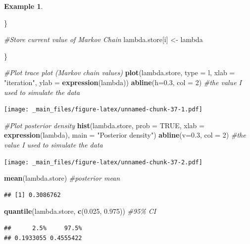 \documentclass[
]{book}
\newenvironment{Shaded}{\begin{snugshade}}{\end{snugshade}}
\newcommand{\AttributeTok}[1]{\textcolor[rgb]{0.13,0.29,0.53}{#1}}
\newcommand{\CommentTok}[1]{\textcolor[rgb]{0.56,0.35,0.01}{\textit{#1}}}
\newcommand{\ConstantTok}[1]{\textcolor[rgb]{0.56,0.35,0.01}{#1}}
\newcommand{\DecValTok}[1]{\textcolor[rgb]{0.00,0.00,0.81}{#1}}
\newcommand{\FloatTok}[1]{\textcolor[rgb]{0.00,0.00,0.81}{#1}}
\newcommand{\FunctionTok}[1]{\textcolor[rgb]{0.13,0.29,0.53}{\textbf{#1}}}
\newcommand{\NormalTok}[1]{#1}
\newcommand{\OtherTok}[1]{\textcolor[rgb]{0.56,0.35,0.01}{#1}}
\newcommand{\StringTok}[1]{\textcolor[rgb]{0.31,0.60,0.02}{#1}}
\theoremstyle{definition}
\theoremstyle{definition}
\newtheorem{example}{Example}[chapter]
\theoremstyle{definition}
\theoremstyle{definition}
\theoremstyle{remark}
\begin{document}
\begin{example}
\begin{Shaded}
\begin{Highlighting}[]
\NormalTok{  \}}
  
  \CommentTok{\#Store current value of Markov Chain}
\NormalTok{  lambda.store[i] }\OtherTok{\textless{}{-}}\NormalTok{ lambda}
  
\NormalTok{\}}

\CommentTok{\#Plot trace plot (Markov chain values)}
\FunctionTok{plot}\NormalTok{(lambda.store, }\AttributeTok{type =} \StringTok{\textquotesingle{}l\textquotesingle{}}\NormalTok{, }\AttributeTok{xlab =} \StringTok{"iteration"}\NormalTok{, }\AttributeTok{ylab =} \FunctionTok{expression}\NormalTok{(lambda))}
\FunctionTok{abline}\NormalTok{(}\AttributeTok{h=}\FloatTok{0.3}\NormalTok{, }\AttributeTok{col =} \DecValTok{2}\NormalTok{) }\CommentTok{\#the value I used to simulate the data}
\end{Highlighting}
\end{Shaded}

\texttt{[image: \_main\_files/figure-latex/unnamed-chunk-37-1.pdf]}

\begin{Shaded}
\begin{Highlighting}[]
\CommentTok{\#Plot posterior density}
\FunctionTok{hist}\NormalTok{(lambda.store, }\AttributeTok{prob =} \ConstantTok{TRUE}\NormalTok{, }\AttributeTok{xlab =} \FunctionTok{expression}\NormalTok{(lambda), }\AttributeTok{main =} \StringTok{"Posterior density"}\NormalTok{)}
\FunctionTok{abline}\NormalTok{(}\AttributeTok{v=}\FloatTok{0.3}\NormalTok{, }\AttributeTok{col =} \DecValTok{2}\NormalTok{) }\CommentTok{\#the value I used to simulate the data}
\end{Highlighting}
\end{Shaded}

\texttt{[image: \_main\_files/figure-latex/unnamed-chunk-37-2.pdf]}

\begin{Shaded}
\begin{Highlighting}[]
\FunctionTok{mean}\NormalTok{(lambda.store) }\CommentTok{\#posterior mean}
\end{Highlighting}
\end{Shaded}

\begin{verbatim}
## [1] 0.3086762
\end{verbatim}

\begin{Shaded}
\begin{Highlighting}[]
\FunctionTok{quantile}\NormalTok{(lambda.store, }\FunctionTok{c}\NormalTok{(}\FloatTok{0.025}\NormalTok{, }\FloatTok{0.975}\NormalTok{)) }\CommentTok{\#95\% CI}
\end{Highlighting}
\end{Shaded}

\begin{verbatim}
##      2.5%     97.5% 
## 0.1933055 0.4555422
\end{verbatim}

\end{example}
\end{document}
